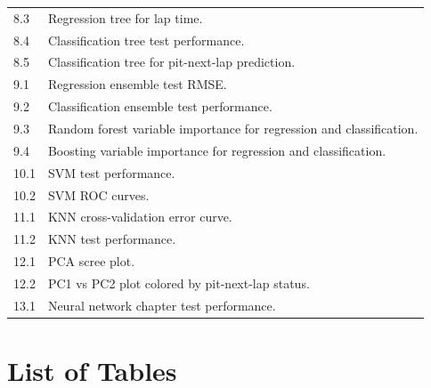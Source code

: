 \documentclass[11pt,oneside,openany]{book}
\begin{document}
\begin{longtable}{p{}p{}}
8.3 & Regression tree for lap time.\\
8.4 & Classification tree test performance.\\
8.5 & Classification tree for pit-next-lap prediction.\\
9.1 & Regression ensemble test RMSE.\\
9.2 & Classification ensemble test performance.\\
9.3 & Random forest variable importance for regression and classification.\\
9.4 & Boosting variable importance for regression and classification.\\
10.1 & SVM test performance.\\
10.2 & SVM ROC curves.\\
11.1 & KNN cross-validation error curve.\\
11.2 & KNN test performance.\\
12.1 & PCA scree plot.\\
12.2 & PC1 vs PC2 plot colored by pit-next-lap status.\\
13.1 & Neural network chapter test performance.\\

\end{longtable}
\endgroup

\clearpage
{}
\chapter*{List of Tables}
\end{document}
